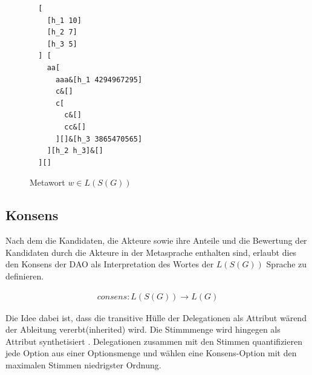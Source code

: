 \documentclass[a4paper,12pt]{report}
\begin{document}
\begin{figure}[ht]
  \centering
  \begin{lstlisting}
  [
    [h_1 10]
    [h_2 7]
    [h_3 5]
  ] [
    aa[
      aaa&[h_1 4294967295]
      c&[]
      c[
        c&[]
        cc&[]
      ][]&[h_3 3865470565]
    ][h_2 h_3]&[]
  ][]
  \end{lstlisting}
    \caption{Metawort $w\in L(S(G))$}
    \label{metaword}
\end{figure}






\subsection{Konsens}

Nach dem die Kandidaten, die Akteure sowie ihre Anteile und die Bewertung der Kandidaten durch die Akteure in der Metasprache enthalten sind, erlaubt dies den Konsens der DAO als Interpretation des Wortes der $L(S(G))$ Sprache zu definieren. 

\begin{eqnarray}
consens: L(S(G)) \rightarrow L(G)
\end{eqnarray}

Die Idee dabei ist, dass die transitive Hülle der Delegationen als
Attribut wärend der Ableitung vererbt(inherited) wird. Die Stimmmenge 
wird hingegen als Attribut synthetisiert \cite{Knuth1968}. Delegationen zusammen mit den Stimmen quantifizieren jede Option aus einer Optionsmenge und wählen
eine Konsens-Option mit den maximalen Stimmen niedrigster Ordnung.


\end{document}

